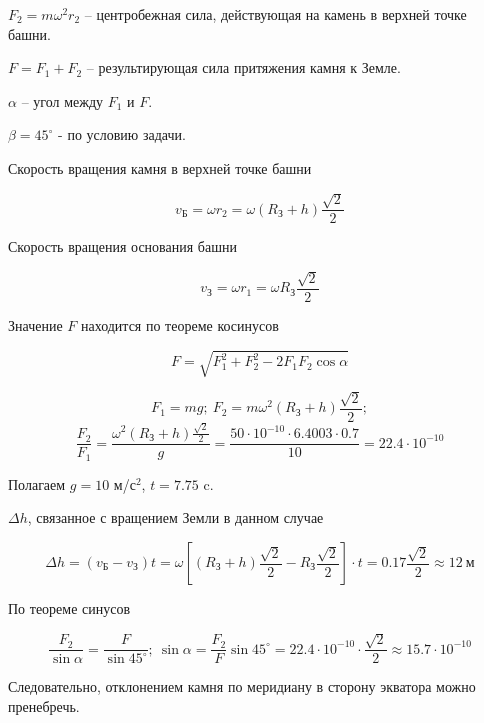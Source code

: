 $F_2=m\omega^2r_2$ – центробежная сила, действующая на камень в верхней точке башни.

$F=F_1+F_2$ – результирующая сила притяжения камня к Земле.

$\alpha$ – угол между $F_1$ и $F$.

$\beta=45^\circ$ - по условию задачи.

Скорость вращения камня в верхней точке башни 

$$v_\text{Б} = \omega r_2 = \omega (R_\text{З} + h) \frac{\sqrt{2}}{2}$$

Скорость вращения основания башни

$$v_\text{З} = \omega r_1 = \omega R_\text{З} \frac{\sqrt{2}}{2}$$

Значение $F$ находится по теореме косинусов  

$$F = \sqrt{F_1^2 + F_2^2 -2F_1F_2 \cos \alpha}$$

$$F_1 = mg; \: F_2 = m \omega^2 (R_\text{З} + h) \frac{\sqrt{2}}{2};$$
$$\frac{F_2}{F_1} = \frac{\omega^2(R_\text{З} + h) \frac{\sqrt{2}}{2}}{g} = \frac{50 \cdot 10^{-10} \cdot 6.4003 \cdot 0.7}{10} = 22.4 \cdot 10^{-10}$$
 
Полагаем $g = 10$ м/с$^2$, $t = 7.75$ c.

$\Delta h$, связанное с вращением Земли в данном случае

$$\Delta h = (v_\text{Б} - v_\text{З})t = \omega \left[ (R_\text{З} + h) \frac{\sqrt{2}}{2} - R_\text{З}\frac{\sqrt{2}}{2} \right] \cdot t = 0.17 \frac{\sqrt{2}}{2} \approx 12 \: \text{м}$$
 
По теореме синусов  

$$\frac{F_2}{\sin \alpha} = \frac{F}{\sin 45^\circ}; \: \sin \alpha = \frac{F_2}{F} \sin 45^\circ = 22.4 \cdot 10^{-10} \cdot \frac{\sqrt{2}}{2} \approx 15.7 \cdot 10^{-10}$$

Следовательно, отклонением камня по меридиану в сторону экватора можно пренебречь.
 

